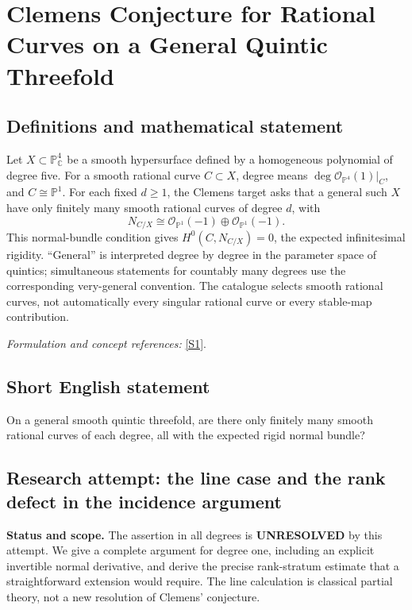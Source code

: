 \documentclass[11pt]{article}
\begin{document}
\section*{\texorpdfstring{Clemens Conjecture for Rational Curves on a General Quintic Threefold}{Clemens Conjecture for Rational Curves on a General Quintic Threefold}}\label{30006905}
\subsection{Definitions and mathematical statement}
Let $X\subset{\mathbb{P}}^4_{{\mathbb{C}}}$ be a smooth hypersurface defined by a homogeneous polynomial of degree five. For a smooth rational curve $C\subset X$, degree means $\deg\mathcal O_{{\mathbb{P}}^4}(1)|_C$, and $C\cong{\mathbb{P}}^1$. For each fixed $d\ge1$, the Clemens target asks that a general such $X$ have only finitely many smooth rational curves of degree $d$, with
\[
 N_{C/X}\cong\mathcal O_{{\mathbb{P}}^1}(-1)\oplus\mathcal O_{{\mathbb{P}}^1}(-1).
\]
This normal-bundle condition gives $H^0(C,N_{C/X})=0$, the expected infinitesimal rigidity. ``General'' is interpreted degree by degree in the parameter space of quintics; simultaneous statements for countably many degrees use the corresponding very-general convention. The catalogue selects smooth rational curves, not automatically every singular rational curve or every stable-map contribution.
\par\smallskip\textit{Formulation and concept references:} \href{https://encyclopediaofmath.org/wiki/Clemens%27_conjecture}{[S1]}.

\subsection{Short English statement}
On a general smooth quintic threefold, are there only finitely many smooth rational curves of each degree, all with the expected rigid normal bundle?
\subsection{Research attempt: the line case and the rank defect in the incidence argument}
\textbf{Status and scope.} The assertion in all degrees is \textbf{UNRESOLVED} by this attempt. We give a complete argument for degree one, including an explicit invertible normal derivative, and derive the precise rank-stratum estimate that a straightforward extension would require. The line calculation is classical partial theory, not a new resolution of Clemens' conjecture.
\end{document}
